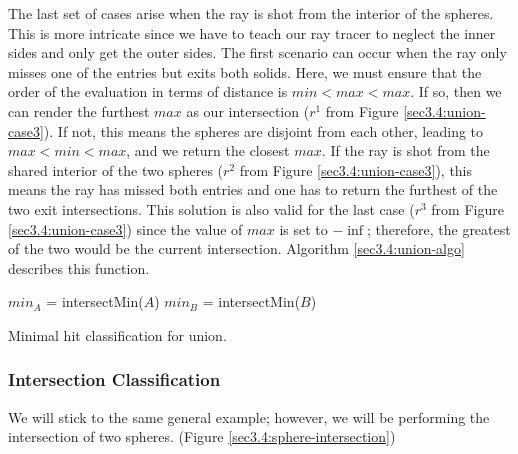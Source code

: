 \documentclass[a4paper,11pt,oneside]{article}
\begin{document}
The last set of cases arise when the ray is shot from the interior of the spheres. This is more intricate since we have to teach our ray tracer to neglect the inner sides and only get the outer sides. The first scenario can occur when the ray only misses one of the entries but exits both solids. Here, we must ensure that the order of the evaluation in terms of distance is $min < max < max$. If so, then we can render the furthest $max$ as our intersection ($r^1$ from Figure \ref{sec3.4:union-case3}). If not, this means the spheres are disjoint from each other, leading to $max < min < max$, and we return the closest $max$. If the ray is shot from the shared interior of the two spheres ($r^2$ from Figure \ref{sec3.4:union-case3}), this means the ray has missed both entries and one has to return the furthest of the two exit intersections. This solution is also valid for the last case ($r^3$ from Figure \ref{sec3.4:union-case3}) since the value of $max$ is set to $-\inf$; therefore, the greatest of the two would be the current intersection. Algorithm \ref{sec3.4:union-algo} describes this function.

\begin{algorithm}
	\SetAlgoLined
	$min_A$ = intersectMin($A$)\;
	$min_B$ = intersectMin($B$)\;
	\caption{Minimal hit classification for union.}
	\label{sec3.4:union-algo}
\end{algorithm}

\subsubsection{Intersection Classification}

We will stick to the same general example; however, we will be performing the intersection of two spheres. (Figure \ref{sec3.4:sphere-intersection})
\end{document}

